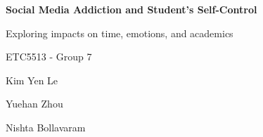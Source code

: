 \begin{titlepage}
  \vspace*{\fill}
  \begin{center}
    {\LARGE\bfseries\color{navyblue} Social Media Addiction and Student's Self-Control \par}
    \vspace{0.5cm}
    {\large\color{navyblue} Exploring impacts on time, emotions, and academics \par}
    \vspace{1cm}
    {\large ETC5513 - Group 7 \par}
    \vspace{0.3cm}
    {\large Kim Yen Le \par}
    {\large Yuehan Zhou \par}
    {\large Nishta Bollavaram \par}
  \end{center}
  \vspace*{\fill}
\end{titlepage}

\clearpage
\setcounter{tocdepth}{1}
\tableofcontents
\clearpage